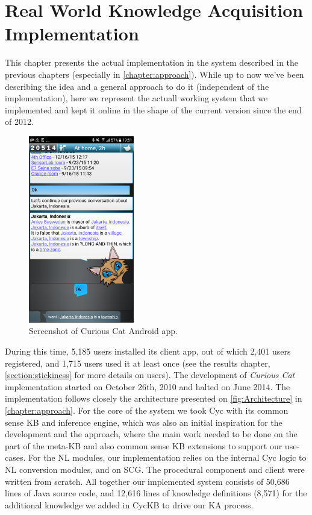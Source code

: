 % 
\chapter{Real World Knowledge Acquisition Implementation}
\label{chapter:implementation}
This chapter presents the actual implementation in the system described
in the previous chapters (especially in \autoref{chapter:approach}). While up 
to now we've been describing the idea and a general approach to do it 
(independent of the implementation), here we represent the actuall working
system that we implemented and kept it online in the shape of the current 
version since the end of 2012. 

\begin{figure}[H]
	\centering
		\includegraphics[width=0.41\textwidth]{figures/androidExample1.png}
	\caption{Screenshot of Curious Cat Android app.}
	\label{fig:androidExample}
\end{figure}

During this time, 5,185 users installed its
client app, out of which 2,401 users registered, and 1,715 users used it at 
least once (see the results chapter, \autoref{section:stickiness} for more 
details on users).
The development  of \emph{Curious Cat} implementation started on October 
26th, 2010 and halted on June 2014. The
implementation follows closely the architecture presented on 
\autoref{fig:Architecture} in \autoref{chapter:approach}. For the core
of the system we took Cyc with its common sense KB and inference engine, which 
was also an initial inspiration for the development and the approach, where
the main work needed to be done on the part of the meta-KB and also common
sense KB extensions to support our use-cases. For the NL modules, our 
implementation relies on the internal Cyc logic to NL conversion modules, and
on SCG\parencite{Schneider2015}. The procedural component and client were 
written from scratch. All together our implemented system consists of 50,686
lines of Java source code, and 12,616 lines of knowledge definitions (8,571) for
the additional knowledge we added in CycKB to drive our KA process.

